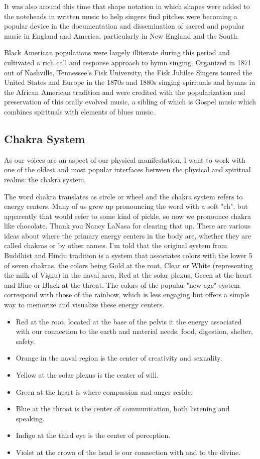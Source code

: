 \documentclass[12pt]{article}
\begin{document}
It was also around this time that shape notation in which shapes were added to the noteheads in written music to help singers find pitches were becoming a popular device in the documentation and dissemination of sacred and popular music in England and America, particularly in New England and the South.

Black American populations were largely illiterate during this period and cultivated a rich call and response approach to hymn singing. Organized in 1871 out of Nashville, Tennessee's Fisk University, the Fisk Jubilee Singers toured the United States and Europe in the 1870s and 1880s singing spirituals and hymns in the African American tradition and were credited with the popularization and preservation of this orally evolved music, a sibling of which is Gospel music which combines spirituals with elements of blues music.

\subsection*{Chakra System}

As our voices are an aspect of our physical manifestation, I want to work with one of the oldest and most popular interfaces between the physical and spiritual realms: the chakra system.

The word chakra translates as circle or wheel and the chakra system refers to energy centers. Many of us grew up pronouncing the word with a soft "ch", but apparently that would refer to some kind of pickle, so now we pronounce chakra like chocolate. Thank you Nancy LaNasa for clearing that up. There are various ideas about where the primary energy centers in the body are, whether they are called chakras or by other names. I'm told that the original system from Buddhist and Hindu tradition is a system that associates colors with the lower 5 of seven chakras, the colors being Gold at the root, Clear or White (representing the milk of Viṣṇu) in the naval area, Red at the solar plexus, Green at the heart and Blue or Black at the throat. The colors of the popular "new age" system correspond with those of the rainbow, which is less engaging but offers a simple way to memorize and visualize these energy centers.

\begin{itemize}
  \item Red at the root, located at the base of the pelvis it the energy associated with our connection to the earth and material needs: food, digestion, shelter, safety.
  \item Orange in the naval region is the center of creativity and sexuality.
  \item Yellow at the solar plexus is the center of will.
  \item Green at the heart is where compassion and anger reside.
  \item Blue at the throat is the center of communication, both listening and speaking.
  \item Indigo at the third eye is the center of perception.
  \item Violet at the crown of the head is our connection with and to the divine.
\end{itemize}
\end{document}
